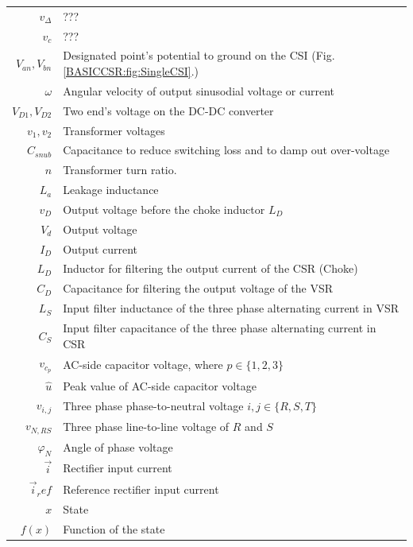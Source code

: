 \begin{scriptsize}
\begin{tabularx}{\textwidth}{r|X}
	$v_\Delta$												& ???\\
	$v_c$															& ???\\
	$V_{an},V_{bn}$  									& Designated point's potential to ground on the CSI (Fig.\ref{BASICCSR:fig:SingleCSI}.)\\
	$\omega$													& Angular velocity of output sinusodial voltage or current\\
	$V_{D1},V_{D2}$ 									& Two end's voltage on the DC-DC converter\\
	$v_1,v_2$                         & Transformer voltages\\
	$C_{snub}$ 												& Capacitance to reduce switching loss and to damp out over-voltage\\
	$n$ 															& Transformer turn ratio.\\
	$L_a$															& Leakage inductance\\
	$v_D$															& Output voltage before the choke inductor $L_D$\\
	$V_d$															& Output voltage\\
	$I_D$															& Output current\\
	$L_D$															& Inductor for filtering the output current of the CSR (Choke)\\
	$C_D$															& Capacitance for filtering the output voltage of the VSR\\
	$L_S$															& Input filter inductance of the three phase alternating current in VSR\\
	$C_S$															& Input filter capacitance of the three phase alternating current in CSR\\
	$v_{c_p}$													& AC-side capacitor voltage, where $p\in\{1,2,3\}$\\
	$\widehat{u}$											& Peak value of AC-side capacitor voltage\\
	$v_{i,j}$													& Three phase phase-to-neutral voltage $i,j\in\{R,S,T\}$\\
	$v_{N,RS}$												& Three phase line-to-line voltage of $R$ and $S$\\
	$\varphi_N$												& Angle of phase voltage\\
	$\vec{i}$													& Rectifier input current\\
	$\vec{i}_ref$											& Reference rectifier input current\\
	$x$																& State\\
	$f(x)$														& Function of the state\\

\end{tabularx}
\end{scriptsize}
